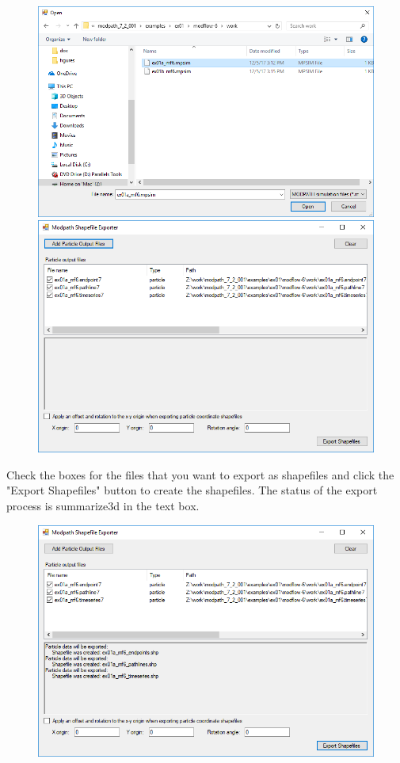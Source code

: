 \documentclass[11pt,twoside,twocolumn]{usgsreport}
\begin{document}
\begin{figure}[H]
  \centering
  \includegraphics[width=\linewidth]{mf_shp_ex_2.PNG}
  \includegraphics[width=\linewidth]{mf_shp_ex_3.PNG}
\end{figure}

Check the boxes for the files that you want to export as shapefiles and click the "Export Shapefiles" button to create the shapefiles. The status of the export process is summarize3d in the text box.

\begin{figure}[H]
 \centering
  \includegraphics[width=\linewidth]{mf_shp_ex_4.PNG}
\end{figure}
\end{document}
